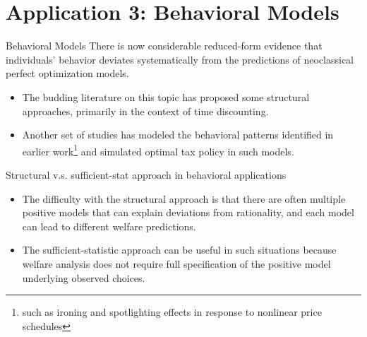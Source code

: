 \documentclass{beamer}
\begin{document}
\section{Application 3: Behavioral Models}
\begin{frame}[shrink]
	\transfade %
	\tableofcontents[sectionstyle=show/shaded,subsectionstyle=show/shaded/hide]
	\addtocounter{framenumber}{-1}
\end{frame}
\begin{frame}{Behavioral Models}
	There is now considerable reduced-form evidence that individuals’ behavior deviates systematically from the predictions of neoclassical perfect optimization models.
	\medskip

	\begin{itemize}
		\item The budding literature on this topic has proposed some structural approaches, primarily in the context of time discounting.
		\item Another set of studies has modeled the behavioral patterns identified in earlier work\footnote{such as ironing and spotlighting effects in response to nonlinear price schedules} and simulated optimal tax policy in such models.
	\end{itemize}
	\begin{block}{Structural v.s. sufficient-stat approach in behavioral applications}
		\begin{itemize}
			\item The difficulty with the structural approach is that there are often multiple positive models that can explain deviations from rationality, and each model can lead to different welfare predictions.
			\item The sufficient-statistic approach can be useful in such situations because welfare analysis does not require full specification of the positive model underlying observed choices.
		\end{itemize}
	\end{block}
\end{frame}
\end{document}
